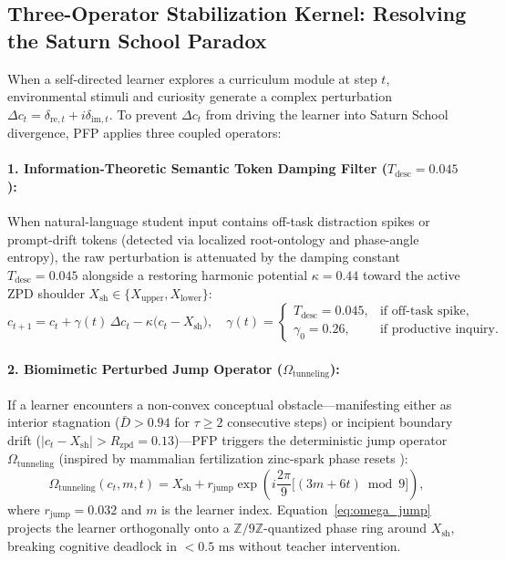 \documentclass[10pt,twocolumn,a4paper]{article}
\begin{document}
\subsection{Three-Operator Stabilization Kernel: Resolving the Saturn School Paradox}
When a self-directed learner explores a curriculum module at step $t$, environmental stimuli and curiosity generate a complex perturbation $\Delta c_t = \delta_{\text{re},t} + i\delta_{\text{im},t}$. To prevent $\Delta c_t$ from driving the learner into Saturn School divergence, PFP applies three coupled operators:

\paragraph{1. Information-Theoretic Semantic Token Damping Filter ($T_{\text{desc}} = 0.045$):}
When natural-language student input contains off-task distraction spikes or prompt-drift tokens (detected via localized root-ontology and phase-angle entropy), the raw perturbation is attenuated by the damping constant $T_{\text{desc}} = 0.045$ \cite{dagli2026werr} alongside a restoring harmonic potential $\kappa = 0.44$ toward the active ZPD shoulder $X_{\text{sh}} \in \{X_{\text{upper}}, X_{\text{lower}}\}$:
\begin{equation}
    c_{t+1} = c_t + \gamma(t)\,\Delta c_t - \kappa \big(c_t - X_{\text{sh}}\big), \quad \gamma(t) = \begin{cases} T_{\text{desc}} = 0.045, & \text{if off-task spike}, \\ \gamma_0 = 0.26, & \text{if productive inquiry}. \end{cases}
    \label{eq:damping}
\end{equation}

\paragraph{2. Biomimetic Perturbed Jump Operator ($\Omega_{\text{tunneling}}$):}
If a learner encounters a non-convex conceptual obstacle—manifesting either as interior stagnation ($\bar{D} > 0.94$ for $\tau \ge 2$ consecutive steps) or incipient boundary drift ($|c_t - X_{\text{sh}}| > R_{\text{zpd}} = 0.13$)—PFP triggers the deterministic jump operator $\Omega_{\text{tunneling}}$ (inspired by mammalian fertilization zinc-spark phase resets \cite{dagli2026oed}):
\begin{equation}
    \Omega_{\text{tunneling}}(c_t, m, t) = X_{\text{sh}} + r_{\text{jump}} \exp\!\left(i \frac{2\pi}{9} \big[(3m + 6t) \bmod 9\big]\right),
    \label{eq:omega_jump}
\end{equation}
where $r_{\text{jump}} = 0.032$ and $m$ is the learner index. Equation~\eqref{eq:omega_jump} projects the learner orthogonally onto a $\mathbb{Z}/9\mathbb{Z}$-quantized phase ring around $X_{\text{sh}}$, breaking cognitive deadlock in $< 0.5\text{ ms}$ without teacher intervention.
\end{document}
